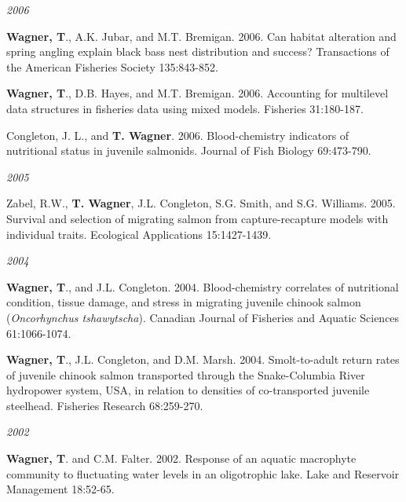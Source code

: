 \documentclass[10pt]{article}
\begin{document}
\begin{flushleft}
\begin{etaremune}[start=9]
\end{etaremune}
\emph{2006}
\begin{etaremune}[start=7]
\item {\bf Wagner, T}., A.K. Jubar, and M.T. Bremigan. 2006. Can habitat alteration and spring angling explain black bass nest distribution and success? Transactions of the American Fisheries Society 135:843-852.

\item {\bf Wagner, T}., D.B. Hayes, and M.T. Bremigan. 2006. Accounting for multilevel data structures in fisheries data using mixed models. Fisheries 31:180-187.

\item Congleton, J. L., and {\bf T. Wagner}. 2006. Blood-chemistry indicators of nutritional status in juvenile salmonids. Journal of Fish Biology 69:473-790.

\end{etaremune}
\emph{2005}
\begin{etaremune}[start=4]
\item Zabel, R.W., {\bf T. Wagner}, J.L. Congleton, S.G. Smith, and S.G. Williams. 2005. Survival and selection of migrating salmon from capture-recapture models with individual traits. Ecological Applications 15:1427-1439. 

\end{etaremune}
\emph{2004}
\begin{etaremune}[start=3]
\item {\bf Wagner, T}., and J.L. Congleton. 2004. Blood-chemistry correlates of nutritional condition, tissue damage, and stress in migrating juvenile chinook salmon (\emph{Oncorhynchus tshawytscha}). Canadian Journal of Fisheries and Aquatic Sciences 61:1066-1074.

\item {\bf Wagner, T}., J.L. Congleton, and D.M. Marsh. 2004. Smolt-to-adult return rates of juvenile chinook salmon transported through the Snake-Columbia River hydropower system, USA, in relation to densities of co-transported juvenile steelhead. Fisheries Research 68:259-270.

\end{etaremune}
\emph{2002}
\begin{etaremune}[start=1]
\item {\bf Wagner, T}. and C.M. Falter. 2002. Response of an aquatic macrophyte community to fluctuating water levels in an oligotrophic lake. Lake and Reservoir Management 18:52-65.
\end{etaremune}


\end{flushleft}
\end{document}
